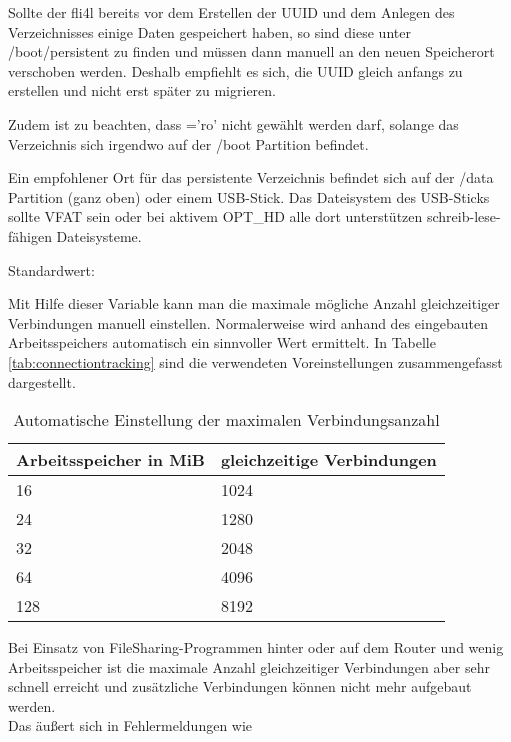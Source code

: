 \begin{description}
{    Sollte der fli4l bereits vor dem Erstellen der UUID und dem Anlegen des Verzeichnisses
    einige Daten gespeichert haben, so sind diese unter /boot/persistent zu finden und müssen
    dann manuell an den neuen Speicherort verschoben werden. Deshalb empfiehlt es sich, die
    UUID gleich anfangs zu erstellen und nicht erst später zu migrieren.

    Zudem ist zu beachten, dass ='ro' nicht gewählt werden darf,
    solange das Verzeichnis sich irgendwo auf der /boot Partition befindet.

    Ein empfohlener Ort für das persistente Verzeichnis befindet sich auf der /data
    Partition (ganz oben) oder einem USB-Stick. Das Dateisystem des USB-Sticks sollte
    VFAT sein oder bei aktivem OPT\_HD alle dort unterstützen schreib-lese-fähigen
    Dateisysteme.}

  
  Standardwert: 
  
  Mit Hilfe dieser Variable kann man die maximale mögliche Anzahl gleichzeitiger
  Verbindungen manuell einstellen. Normalerweise wird anhand des eingebauten
  Arbeitsspeichers automatisch ein sinnvoller Wert ermittelt. In Tabelle
  \ref{tab:connectiontracking} sind die verwendeten Voreinstellungen
  zusammengefasst dargestellt.

    \begin{table}[ht!]
        \centering
        \caption{Automatische Einstellung der maximalen Verbindungsanzahl}
        \begin{tabular}{p{6cm}p{6cm}}
            Arbeitsspeicher in MiB   &    gleichzeitige Verbindungen \\\hline
            16                       &    1024 \\
            24                       &    1280 \\
            32                       &    2048 \\
            64                       &    4096 \\
            128                      &    8192 \\
        \end{tabular}
    \end{table}

   Bei Einsatz von FileSharing-Programmen hinter oder auf dem Router und wenig
   Arbeitsspeicher ist die maximale Anzahl gleichzeitiger Verbindungen aber
   sehr schnell erreicht und zusätzliche Verbindungen können nicht mehr
   aufgebaut werden.\\ 
   Das äußert sich in Fehlermeldungen wie
   

\end{description}
